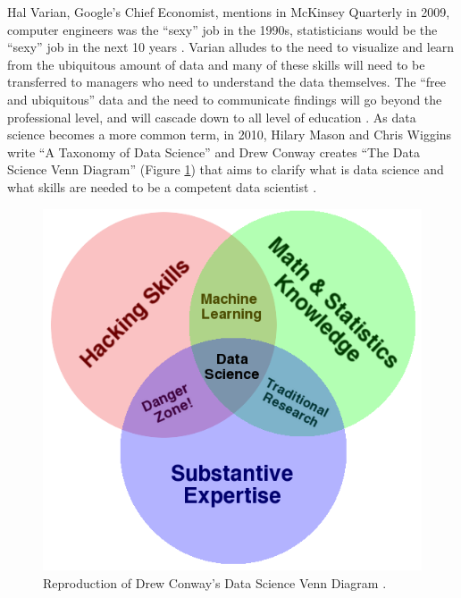 \documentclass[010-intro.tex]{subfiles}
\begin{document}
    Hal Varian, Google's Chief Economist, mentions in McKinsey Quarterly in 2009,
    computer engineers was the ``sexy'' job in the 1990s,
    statisticians would be the ``sexy'' job in the next 10 years
    \cite{HalVarianHow2009}.
    Varian alludes to
    the need to visualize and learn from the ubiquitous amount of data and
    many of these skills will need to be transferred to managers who need to understand the data themselves.
    The ``free and ubiquitous'' data and the need to communicate findings will go beyond the professional level,
    and will cascade down to all level of education
    \cite{HalVarianHow2009}.
    As data science becomes a more common term,
    in 2010, Hilary Mason and Chris Wiggins write ``A Taxonomy of Data Science''
    \cite{masonTaxonomyDataScience2010}
    and
    Drew Conway creates ``The Data Science Venn Diagram'' (Figure \ref{fig:conway-venn})
    that aims to clarify what is data science and what skills are needed to be a competent data scientist
    \cite{conwayDataScienceVenn2010}.
    \begin{figure}[htb]
        \centering
        \includegraphics[scale=0.5]{figs/050-intro/Data_Science_VD}
        \caption[Drew Conway's Data Science Venn Diagram]{
        Reproduction of Drew Conway's Data Science Venn Diagram \cite{conwayDataScienceVenn2010}.
        }
        \label{fig:conway-venn}
    \end{figure}
\end{document}
